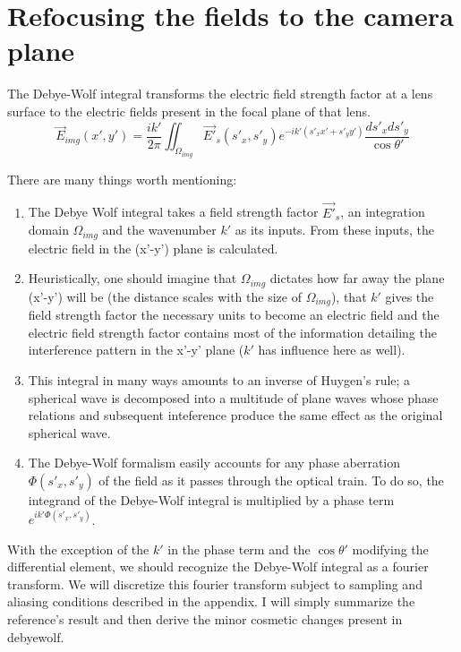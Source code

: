 \section{Refocusing the fields to the camera plane}
The Debye-Wolf integral transforms the electric field strength factor at a lens
surface to the electric fields present in the focal plane of that lens.
\begin{equation*}
  \vec{E}_{img}(x', y') = \frac{i k'}{2 \pi} \iint_{\Omega_{img}} \vec{E'}_s(s'_x, s'_y) e^{-ik'(s'_xx'+s'_yy')}\frac{ds'_xds'_y}{\cos{\theta'}}
\end{equation*}

There are many things worth mentioning:
\begin{enumerate}
\item The Debye Wolf integral takes a field strength factor $\vec{E'}_s$,
  an integration domain $\Omega_{img}$ and the wavenumber $k'$ as its inputs.
  From these inputs, the electric field in the (x'-y') plane is
  calculated. 
\item Heuristically, one should imagine that $\Omega_{img}$ dictates how far 
  away the plane (x'-y') will be (the distance scales with the size of 
  $\Omega_{img}$), that $k'$ gives the field strength factor the necessary 
  units to become an electric field and the electric field strength factor 
  contains most of the information detailing the interference pattern in the
  x'-y' plane ($k'$ has influence here as well).
\item This integral in many ways amounts to
  an inverse of Huygen's rule; a spherical wave is decomposed into a multitude 
  of plane waves whose phase relations and subsequent inteference produce
  the same effect as the original spherical wave.
\item The Debye-Wolf formalism easily accounts for any phase aberration 
  $\Phi(s'_x,s'_y)$ of the field as it passes through the optical train. To do so, the integrand
  of the Debye-Wolf integral is multiplied by a phase term $e^{ik'\Phi(s'_x,s'_y)}$.
\end{enumerate}

With the exception of the $k'$ in the phase term and the $\cos{\theta'}$ 
modifying the differential element, we should recognize the
Debye-Wolf integral as a fourier transform. We will discretize this
fourier transform subject to sampling and aliasing conditions described
in the appendix. I will simply summarize the reference's result and then
derive the minor cosmetic changes present in debyewolf.


